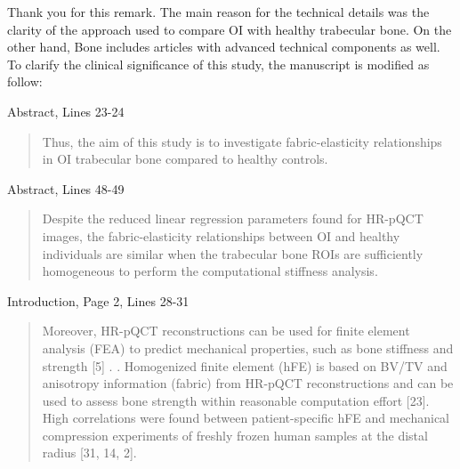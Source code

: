 \documentclass{AR2RC}
\begin{document}
\AR Thank you for this remark. The main reason for the technical details was the clarity of the approach used to compare OI with healthy trabecular bone. On the other hand, Bone includes articles with advanced technical components as well. To clarify the clinical significance of this study, the manuscript is modified as follow:

Abstract, Lines 23-24
\begin{quote}
	Thus, the aim of this study is to investigate fabric-elasticity relationships in OI trabecular bone compared to healthy controls.
\end{quote}

Abstract, Lines 48-49
\begin{quote}
	 Despite the reduced linear regression parameters found for HR-pQCT images, the fabric-elasticity relationships between OI and healthy individuals are similar when the trabecular bone ROIs are sufficiently homogeneous to perform the computational stiffness analysis.  
\end{quote}

Introduction, Page 2, Lines 28-31
\begin{quote}
	Moreover, HR-pQCT reconstructions can be used for finite element analysis (FEA) to predict mechanical properties, such as bone stiffness and strength [5] . . Homogenized finite element (hFE) is based on  BV/TV and anisotropy information (fabric) from HR-pQCT reconstructions and can be used to assess bone strength within reasonable computation effort [23]. High correlations were found between patient-specific hFE and mechanical compression experiments of freshly frozen human samples at the distal radius [31, 14, 2]. 
\end{quote}
\end{document}
